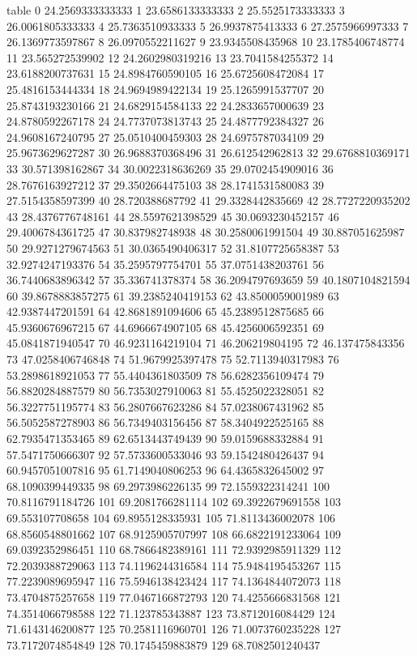 table {%
0 24.2569333333333
1 23.6586133333333
2 25.5525173333333
3 26.0061805333333
4 25.7363510933333
5 26.9937875413333
6 27.2575966997333
7 26.1369773597867
8 26.0970552211627
9 23.9345508435968
10 23.1785406748774
11 23.565272539902
12 24.2602980319216
13 23.7041584255372
14 23.6188200737631
15 24.8984760590105
16 25.6725608472084
17 25.4816153444334
18 24.9694989422134
19 25.1265991537707
20 25.8743193230166
21 24.6829154584133
22 24.2833657000639
23 24.8780592267178
24 24.7737073813743
25 24.4877792384327
26 24.9608167240795
27 25.0510400459303
28 24.6975787034109
29 25.9673629627287
30 26.9688370368496
31 26.612542962813
32 29.6768810369171
33 30.571398162867
34 30.0022318636269
35 29.0702454909016
36 28.7676163927212
37 29.3502664475103
38 28.1741531580083
39 27.5154358597399
40 28.720388687792
41 29.3328442835669
42 28.7727220935202
43 28.4376776748161
44 28.5597621398529
45 30.0693230452157
46 29.4006784361725
47 30.837982748938
48 30.2580061991504
49 30.887051625987
50 29.9271279674563
51 30.0365490406317
52 31.8107725658387
53 32.9274247193376
54 35.2595797754701
55 37.0751438203761
56 36.7440683896342
57 35.336741378374
58 36.2094797693659
59 40.1807104821594
60 39.8678883857275
61 39.2385240419153
62 43.8500059001989
63 42.9387447201591
64 42.8681891094606
65 45.2389512875685
66 45.9360676967215
67 44.6966674907105
68 45.4256006592351
69 45.0841871940547
70 46.9231164219104
71 46.206219804195
72 46.137475843356
73 47.0258406746848
74 51.9679925397478
75 52.7113940317983
76 53.2898618921053
77 55.4404361803509
78 56.6282356109474
79 56.8820284887579
80 56.7353027910063
81 55.4525022328051
82 56.3227751195774
83 56.2807667623286
84 57.0238067431962
85 56.5052587278903
86 56.7349403156456
87 58.3404922525165
88 62.7935471353465
89 62.6513443749439
90 59.0159688332884
91 57.5471750666307
92 57.5733600533046
93 59.1542480426437
94 60.9457051007816
95 61.7149040806253
96 64.4365832645002
97 68.1090399449335
98 69.2973986226135
99 72.1559322314241
100 70.8116791184726
101 69.2081766281114
102 69.3922679691558
103 69.553107708658
104 69.8955128335931
105 71.8113436002078
106 68.8560548801662
107 68.9125905707997
108 66.6822191233064
109 69.0392352986451
110 68.7866482389161
111 72.9392985911329
112 72.2039388729063
113 74.1196244316584
114 75.9484195453267
115 77.2239089695947
116 75.5946138423424
117 74.1364844072073
118 73.4704875257658
119 77.0467166872793
120 74.4255666831568
121 74.3514066798588
122 71.123785343887
123 73.8712016084429
124 71.6143146200877
125 70.2581116960701
126 71.0073760235228
127 73.7172074854849
128 70.1745459883879
129 68.7082501240437
}
